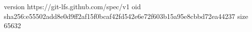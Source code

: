 version https://git-lfs.github.com/spec/v1
oid sha256:e55502add8e0d9ff2af15f0bcaf42fd542e6e72f603b15a95e8cbbd72ea44237
size 65632

